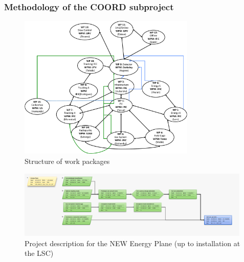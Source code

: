 %
%

\subsubsection*{Methodology of the COORD subproject}


\begin{figure}[h!]
\begin{center}
\includegraphics[width=0.75\textwidth]{img/PMP.pdf}
\end{center}
\caption{\label{Fig:PMP}Structure of work packages}
\end{figure}

%
\begin{figure}[h!]
\begin{center}
\includegraphics[width=0.99\textwidth]{img/EPG.png}
\end{center}
\caption{\label{Fig:NFC} Project description for the NEW Energy Plane (up to installation at the LSC)}
\end{figure}


